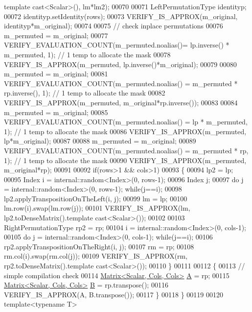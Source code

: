 \begin{DoxyCode}
      template cast<Scalar>(), lm*lm2);
00070 
00071   LeftPermutationType identityp;
00072   identityp.setIdentity(rows);
00073   VERIFY\_IS\_APPROX(m\_original, identityp*m\_original);
00074   
00075   \textcolor{comment}{// check inplace permutations}
00076   m\_permuted = m\_original;
00077   VERIFY\_EVALUATION\_COUNT(m\_permuted.noalias()= lp.inverse() * m\_permuted, 1); \textcolor{comment}{// 1 temp to allocate the
       mask}
00078   VERIFY\_IS\_APPROX(m\_permuted, lp.inverse()*m\_original);
00079   
00080   m\_permuted = m\_original;
00081   VERIFY\_EVALUATION\_COUNT(m\_permuted.noalias() = m\_permuted * rp.inverse(), 1); \textcolor{comment}{// 1 temp to allocate the
       mask}
00082   VERIFY\_IS\_APPROX(m\_permuted, m\_original*rp.inverse());
00083   
00084   m\_permuted = m\_original;
00085   VERIFY\_EVALUATION\_COUNT(m\_permuted.noalias() = lp * m\_permuted, 1); \textcolor{comment}{// 1 temp to allocate the mask}
00086   VERIFY\_IS\_APPROX(m\_permuted, lp*m\_original);
00087   
00088   m\_permuted = m\_original;
00089   VERIFY\_EVALUATION\_COUNT(m\_permuted.noalias() = m\_permuted * rp, 1); \textcolor{comment}{// 1 temp to allocate the mask}
00090   VERIFY\_IS\_APPROX(m\_permuted, m\_original*rp);
00091 
00092   \textcolor{keywordflow}{if}(rows>1 && cols>1)
00093   \{
00094     lp2 = lp;
00095     Index i = internal::random<Index>(0, rows-1);
00096     Index j;
00097     \textcolor{keywordflow}{do} j = internal::random<Index>(0, rows-1); \textcolor{keywordflow}{while}(j==i);
00098     lp2.applyTranspositionOnTheLeft(i, j);
00099     lm = lp;
00100     lm.row(i).swap(lm.row(j));
00101     VERIFY\_IS\_APPROX(lm, lp2.toDenseMatrix().template cast<Scalar>());
00102 
00103     RightPermutationType rp2 = rp;
00104     i = internal::random<Index>(0, cols-1);
00105     \textcolor{keywordflow}{do} j = internal::random<Index>(0, cols-1); \textcolor{keywordflow}{while}(j==i);
00106     rp2.applyTranspositionOnTheRight(i, j);
00107     rm = rp;
00108     rm.col(i).swap(rm.col(j));
00109     VERIFY\_IS\_APPROX(rm, rp2.toDenseMatrix().template cast<Scalar>());
00110   \}
00111 
00112   \{
00113     \textcolor{comment}{// simple compilation check}
00114     \hyperlink{group___core___module_class_eigen_1_1_matrix}{Matrix<Scalar, Cols, Cols>} \hyperlink{group___core___module_class_eigen_1_1_matrix}{A} = rp;
00115     \hyperlink{group___core___module_class_eigen_1_1_matrix}{Matrix<Scalar, Cols, Cols>} \hyperlink{group___core___module_class_eigen_1_1_matrix}{B} = rp.transpose();
00116     VERIFY\_IS\_APPROX(A, B.transpose());
00117   \}
00118 \}
00119 
00120 \textcolor{keyword}{template}<\textcolor{keyword}{typename} T>

\end{DoxyCode}
